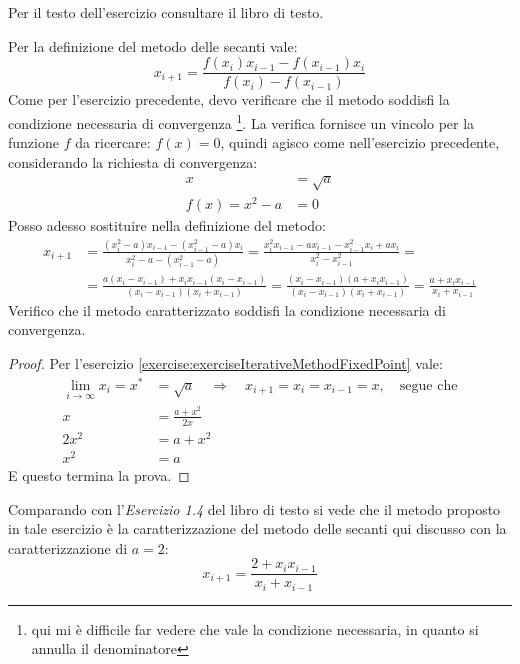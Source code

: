\begin{exercise}[2.3]
Per il testo dell'esercizio consultare il libro di testo.
\end{exercise}
Per la definizione del metodo delle secanti vale:
\begin{displaymath}
	x_{i + 1} = \frac{f(x_{i})x_{i-1} - f(x_{i-1})x_{i}}{f(x_{i}) - f(x_{i-1})}
\end{displaymath}
Come per l'esercizio precedente, devo verificare che il metodo soddisfi la
condizione necessaria di convergenza \footnote{qui mi \`e difficile far vedere
che vale la condizione necessaria, in quanto si annulla il denominatore}.
La verifica fornisce un vincolo per la funzione $f$ da ricercare: $f(x) = 0$, 
quindi agisco come nell'esercizio precedente, considerando la richiesta di
convergenza:
\begin{equation}
\begin{split}
	x &= \sqrt{a} \\
	f(x) = x^{2} - a &= 0
\end{split}
\end{equation}
Posso adesso sostituire nella definizione del metodo:
\begin{displaymath}
\begin{split}
	x_{i + 1} &= \frac{(x_{i}^{2} - a)x_{i-1} - (x_{i-1}^{2} - a)x_{i}}
		{x_{i}^{2} - a - (x_{i-1}^{2} - a)}
			  = \frac{x_{i}^{2} x_{i-1} - a x_{i-1} - 
						x_{i-1}^{2} x_{i} + a x_{i}}
					{x_{i}^{2} - x_{i-1}^{2}} = \\
			  &= \frac{a(x_{i} - x_{i-1}) + x_{i}x_{i-1}(x_{i} - x_{i-1})}
					{(x_{i} - x_{i-1})(x_{i} + x_{i-1})} 
			  = \frac{(x_{i} - x_{i-1})(a + x_{i}x_{i-1})}
					{(x_{i} - x_{i-1})(x_{i} + x_{i-1})} 
			  = \frac{a + x_{i}x_{i-1}}{x_{i} + x_{i-1}}
\end{split}
\end{displaymath}
Verifico che il metodo caratterizzato soddisfi la condizione necessaria di
convergenza.
\begin{proof}
Per l'esercizio \ref{exercise:exerciseIterativeMethodFixedPoint} vale:
\begin{displaymath}
\begin{split}
\lim_{i\rightarrow\infty}{x_{i}} = x^{*} & = \sqrt{a} \quad\Rightarrow \quad
x_{i+1} = x_{i} = x_{i-1} = x, \quad \text{segue che} \\
x &= \frac{a + x^{2}}{2x} \\ 
2x^{2} &= a + x^{2} \\
x^{2} &= a
\end{split}
\end{displaymath}
E questo termina la prova.
\end{proof}
Comparando con l'\emph{Esercizio 1.4} del libro di testo si vede che il metodo
proposto in tale esercizio \`e la caratterizzazione del metodo delle secanti 
qui discusso con la caratterizzazione di $a = 2$:
\begin{displaymath}
x_{i + 1} = \frac{2 + x_{i}x_{i-1}}{x_{i} + x_{i-1}}
\end{displaymath}
